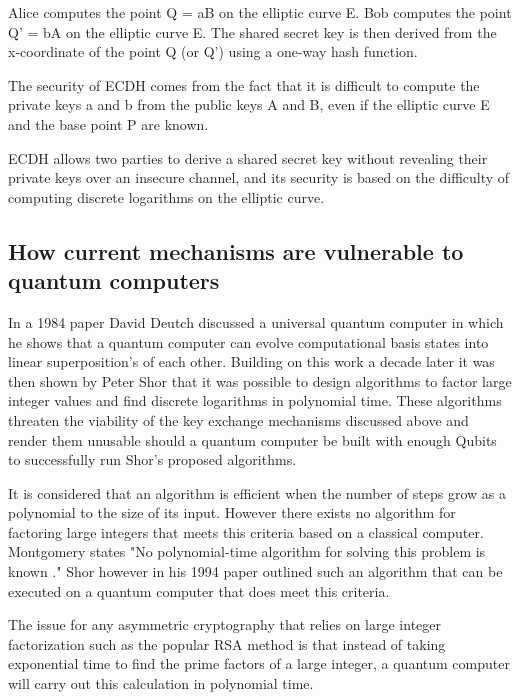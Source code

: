 \documentclass{article}
\begin{document}
Alice computes the point Q = aB on the elliptic curve E.
Bob computes the point Q' = bA on the elliptic curve E.
The shared secret key is then derived from the x-coordinate of the point Q (or Q') using a one-way hash function.

The security of ECDH comes from the fact that it is difficult to compute the private keys a and b from the public keys A and B, even if the elliptic curve E and the base point P are known.

ECDH allows two parties to derive a shared secret key without revealing their private keys over an insecure channel, and its security is based on the difficulty of computing discrete logarithms on the elliptic curve.

\subsection{How current mechanisms are vulnerable to quantum computers}
In a 1984 paper David Deutch \cite{Deutsch1985QuantumComputer} discussed a universal quantum computer in which he shows that a quantum computer can evolve computational basis states into linear superposition's of each other. Building on this work a decade later it was then shown by Peter Shor \cite{Shor1994AlgorithmsFactoring} that it was possible to design algorithms to factor large integer values and find discrete logarithms in polynomial time. These algorithms threaten the viability of the key exchange mechanisms discussed above and render them unusable should a quantum computer be built with enough Qubits to successfully run Shor's proposed algorithms.

It is considered that an algorithm is efficient when the number of steps grow as a polynomial to the size of its input. \cite{Shor1994AlgorithmsFactoring}  However there exists no algorithm for factoring large integers that meets this criteria based on a classical computer. Montgomery \cite{Montgomery1994AAlgorithms} states "No polynomial-time algorithm for solving this problem is known ."  Shor however in his 1994 paper  outlined  \cite{Shor1994AlgorithmsFactoring} such an algorithm that can be executed on a quantum computer that does meet this criteria. 

The issue for any asymmetric cryptography that relies on large integer factorization such as the popular RSA method is that instead of taking exponential time to find the prime factors of a large integer, a quantum computer will carry out this calculation in polynomial time. 
\end{document}
